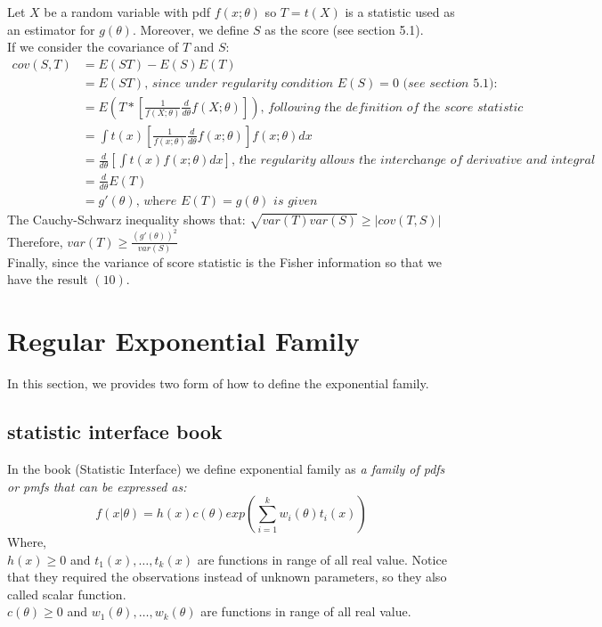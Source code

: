 \documentclass[12pt ]{article}
\begin{document}
Let $X$ be a random variable with pdf $f(x;\theta)$ so $T=t(X)$ is a statistic used as an estimator for $g(\theta)$. Moreover, we define $S$ as the score (see section 5.1). \\
If we consider the covariance of $T$ and $S$:
\begin{align*}
cov(S, T) &= E(ST) - E(S)E(T) \\
 &= E(ST) \textit{,    since under regularity condition $E(S)=0$ (see section 5.1):} \\
&= E(T * [\frac{1}{f(X;\theta)} \frac{d}{d\theta} f(X; \theta)])  \textit{,    following the definition of the score statistic} \\
&= \int t(x) [\frac{1}{f(x;\theta)} \frac{d}{d\theta} f(x;\theta)] f(x;\theta) dx \\
&= \frac{d}{d\theta}[\int t(x)f(x;\theta) dx] \textit{,    the regularity allows the interchange of derivative and integral} \\
&= \frac{d}{d\theta} E(T) \\
 &= g'(\theta) \textit{,    where $E(T) = g(\theta)$ is given}
\end{align*}
The Cauchy-Schwarz inequality shows that: $\sqrt{var(T)var(S)} \geq |cov(T,S)|$ \\
Therefore, $var(T) \geq \frac{(g'(\theta))^2 }{var(S)}$ \\
Finally, since the variance of score statistic is the Fisher information so that we have the result $(10)$.

\section{Regular Exponential Family}
In this section, we provides two form of how to define the exponential family.
\subsection{statistic interface book}
In the book (Statistic Interface) we define exponential family as \textit{ a family of pdfs or pmfs that can be expressed as:}
\begin{equation}
f(x|\theta) = h(x)c(\theta)exp(\sum_{i=1}^{k} w_{i}(\theta)t_{i}(x))
\end{equation}
Where, \\
$h(x) \geq 0$ and  $t_{1}(x), \ldots, t_{k}(x)$ are functions in range of all real value. Notice that they required the observations instead of unknown parameters, so they also called scalar function.\\
$c(\theta) \geq 0$ and $w_{1}(\theta), \ldots, w_{k}(\theta)$ are functions in range of all real value.\\
\end{document}
